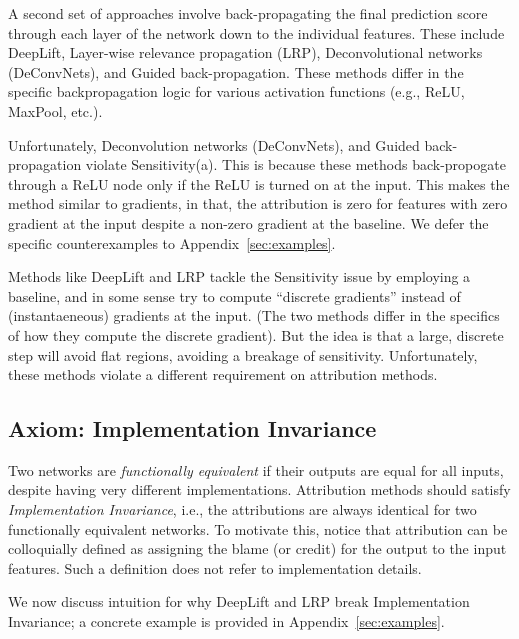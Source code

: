  A second set of approaches
involve back-propagating the final prediction score through each layer
of the network down to the individual features.  These include
DeepLift, Layer-wise relevance propagation (LRP), Deconvolutional networks (DeConvNets),
and Guided back-propagation. These methods differ in
the specific backpropagation logic for various activation functions
(e.g., ReLU, MaxPool, etc.).

Unfortunately, Deconvolution networks (DeConvNets), and
Guided back-propagation violate Sensitivity(a).
This is because these methods back-propogate through a ReLU node
only if the ReLU is turned on at the input. This makes the method
similar to gradients, in that, the attribution is zero for features
with zero gradient at the input despite a non-zero gradient at the
baseline. We defer the specific counterexamples to Appendix~\ref{sec:examples}.

Methods like DeepLift and LRP tackle the Sensitivity issue by
employing a baseline, and in some sense try to compute ``discrete
gradients'' instead of (instantaeneous) gradients at the input.
(The two methods differ in the specifics of how they compute the discrete gradient).
But the idea is that a large, discrete step will avoid flat regions, avoiding a
breakage of sensitivity.  Unfortunately, these methods violate a
different requirement on attribution methods.

\subsection{Axiom: Implementation Invariance} Two networks are \emph{functionally
equivalent} if their outputs are equal for all inputs, despite
having very different implementations. Attribution
methods should satisfy \emph{Implementation Invariance}, i.e., the
attributions are always identical for two functionally equivalent
networks.  To motivate this, notice that attribution can be
colloquially defined as assigning the blame (or credit) for the
output to the input features. Such a definition does not refer to
implementation details.

We now discuss intuition for why DeepLift and LRP break Implementation
Invariance; a concrete example is provided in Appendix~\ref{sec:examples}.

